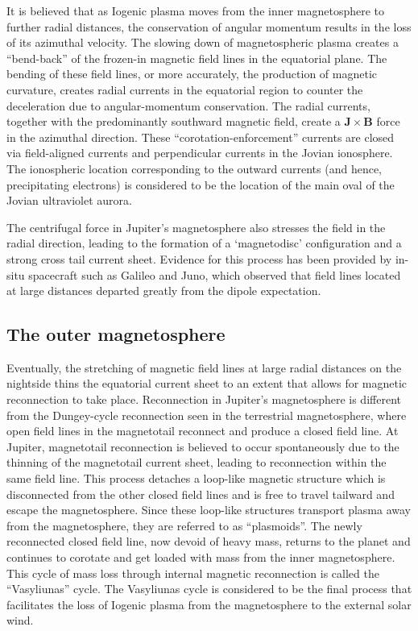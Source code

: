 It is believed that as Iogenic plasma moves from the inner magnetosphere to further radial distances, the conservation of angular momentum results in the loss of its azimuthal velocity. The slowing down of magnetospheric plasma creates a ``bend-back'' of the frozen-in magnetic field lines in the equatorial plane. The bending of these field lines, or more accurately, the production of magnetic curvature, creates radial currents in the equatorial region to counter the deceleration due to angular-momentum conservation. The radial currents, together with the predominantly southward magnetic field, create a $\mathbf{J}\times\mathbf{B}$ force in the azimuthal direction. These ``corotation-enforcement'' currents are closed via field-aligned currents and perpendicular currents in the Jovian ionosphere. The ionospheric location corresponding to the outward currents (and hence, precipitating electrons) is considered to be the location of the main oval of the Jovian ultraviolet aurora.

The centrifugal force in Jupiter's magnetosphere also stresses the field in the radial direction, leading to the formation of a `magnetodisc' configuration and a strong cross tail current sheet. Evidence for this process has been provided by in-situ spacecraft such as Galileo and Juno, which observed that field lines located at large distances departed greatly from the dipole expectation. 

\subsection{The outer magnetosphere}
Eventually, the stretching of magnetic field lines at large radial distances on the nightside thins the equatorial current sheet to an extent that allows for magnetic reconnection to take place. Reconnection in Jupiter's magnetosphere is different from the Dungey-cycle reconnection seen in the terrestrial magnetosphere, where open field lines in the magnetotail reconnect and produce a closed field line. At Jupiter, magnetotail reconnection is believed to occur spontaneously due to the thinning of the magnetotail current sheet, leading to reconnection within the same field line. This process detaches a loop-like magnetic structure which is disconnected from the other closed field lines and is free to travel tailward and escape the magnetosphere. Since these loop-like structures transport plasma away from the magnetosphere, they are referred to as ``plasmoids''. The newly reconnected closed field line, now devoid of heavy mass, returns to the planet and continues to corotate and get loaded with mass from the inner magnetosphere. This cycle of mass loss through internal magnetic reconnection is called the ``Vasyliunas'' cycle. The Vasyliunas cycle is considered to be the final process that facilitates the loss of Iogenic plasma from the magnetosphere to the external solar wind.

